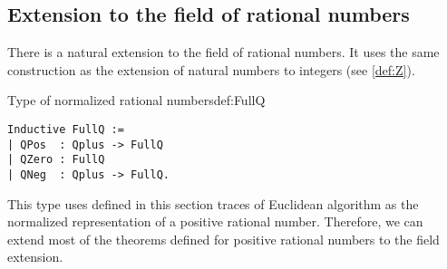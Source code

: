 \subsection{Extension to the field of rational numbers}
There is a  natural extension to the field of rational numbers. It uses the same construction as the extension of natural numbers to integers (see \ref{def:Z}).
\begin{defi}{Type of normalized rational numbers}{def:FullQ}
\begin{verbatim}
Inductive FullQ :=
| QPos  : Qplus -> FullQ
| QZero : FullQ
| QNeg  : Qplus -> FullQ.
\end{verbatim}
\end{defi}
This type uses defined in this section traces of Euclidean algorithm as the normalized representation of a positive rational number. Therefore, we can extend most of the theorems defined for positive rational numbers to the field extension.
